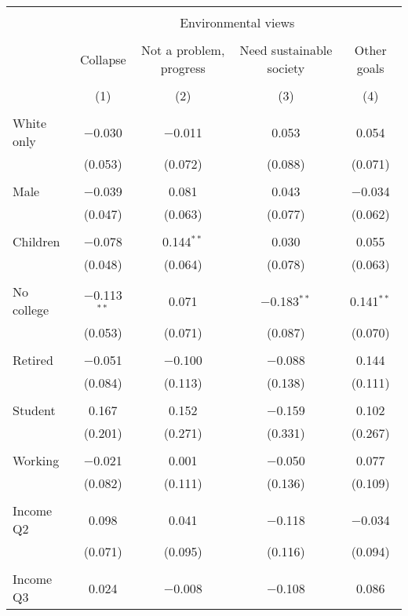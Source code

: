 
\begin{tabular}{@{\extracolsep{5pt}}lcccc} 
\\[-1.8ex]\hline 
\hline \\[-1.8ex] 
 & \multicolumn{4}{c}{Environmental views} \\ 
\cline{2-5} 
\\[-1.8ex] & Collapse & Not a problem, progress & Need sustainable society & Other goals \\ 
\\[-1.8ex] & (1) & (2) & (3) & (4)\\ 
\hline \\[-1.8ex] 
 White only & $-$0.030 & $-$0.011 & 0.053 & 0.054 \\ 
  & (0.053) & (0.072) & (0.088) & (0.071) \\ 
  & & & & \\ 
 Male & $-$0.039 & 0.081 & 0.043 & $-$0.034 \\ 
  & (0.047) & (0.063) & (0.077) & (0.062) \\ 
  & & & & \\ 
 Children & $-$0.078 & 0.144$^{**}$ & 0.030 & 0.055 \\ 
  & (0.048) & (0.064) & (0.078) & (0.063) \\ 
  & & & & \\ 
 No college & $-$0.113$^{**}$ & 0.071 & $-$0.183$^{**}$ & 0.141$^{**}$ \\ 
  & (0.053) & (0.071) & (0.087) & (0.070) \\ 
  & & & & \\ 
 Retired & $-$0.051 & $-$0.100 & $-$0.088 & 0.144 \\ 
  & (0.084) & (0.113) & (0.138) & (0.111) \\ 
  & & & & \\ 
 Student & 0.167 & 0.152 & $-$0.159 & 0.102 \\ 
  & (0.201) & (0.271) & (0.331) & (0.267) \\ 
  & & & & \\ 
 Working & $-$0.021 & 0.001 & $-$0.050 & 0.077 \\ 
  & (0.082) & (0.111) & (0.136) & (0.109) \\ 
  & & & & \\ 
 Income Q2 & 0.098 & 0.041 & $-$0.118 & $-$0.034 \\ 
  & (0.071) & (0.095) & (0.116) & (0.094) \\ 
  & & & & \\ 
 Income Q3 & 0.024 & $-$0.008 & $-$0.108 & 0.086 \\ 

\end{tabular}
